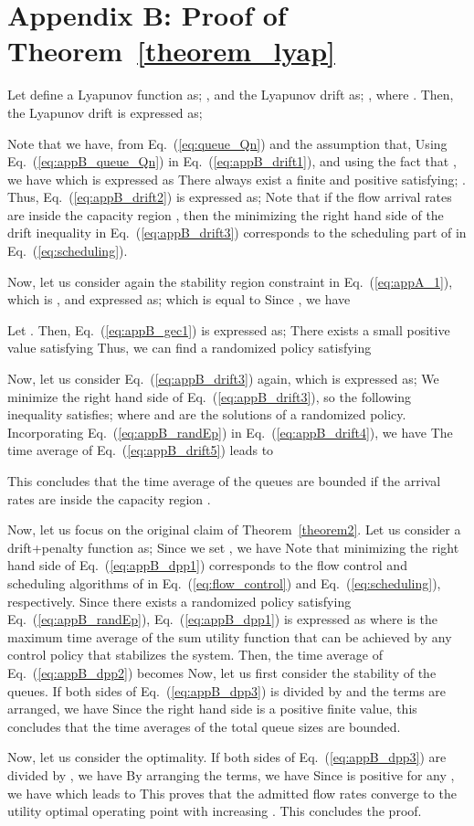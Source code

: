 \documentclass[conference]{IEEEtran}
\begin{document}
\section*{Appendix B: Proof of Theorem~\ref{theorem_lyap}}
Let define a Lyapunov function as; , and the Lyapunov drift as; , where . Then, the Lyapunov drift is expressed as; 
  

Note that we have, from Eq.~(\ref{eq:queue_Qn}) and the assumption  that,
 Using Eq.~(\ref{eq:appB_queue_Qn}) in Eq.~(\ref{eq:appB_drift1}), and using the fact that , we have 
 which is expressed as
 There always exist a finite and positive  satisfying; . Thus, Eq.~(\ref{eq:appB_drift2}) is expressed as; 
 Note that if the flow arrival rates  are inside the capacity region , then the minimizing the right hand side of the drift inequality in Eq.~(\ref{eq:appB_drift3}) corresponds to the scheduling part of  in Eq.~(\ref{eq:scheduling}). 

Now, let us consider again the stability region constraint in Eq.~(\ref{eq:appA_1}), which is   , and expressed as; 
 which is equal to
 Since , we have


  Let . Then, Eq.~(\ref{eq:appB_gec1}) is expressed as; 
  There exists a small positive value  satisfying
  Thus, we can find a randomized policy satisfying 


Now, let us consider Eq.~(\ref{eq:appB_drift3}) again, which is expressed as; 
 We minimize the right hand side of Eq.~(\ref{eq:appB_drift3}), so the following inequality satisfies; 
 where  and  are the solutions of a randomized policy. Incorporating Eq.~(\ref{eq:appB_randEp}) in Eq.~(\ref{eq:appB_drift4}), we have
 The time average of Eq.~(\ref{eq:appB_drift5}) leads to
 
 This concludes that the time average of the queues are bounded if the arrival rates are inside the capacity region . 

Now, let us focus on the original claim of Theorem~\ref{theorem2}. Let us consider a drift+penalty function as; 
 Since we set , we have
 Note that minimizing the right hand side of Eq.~(\ref{eq:appB_dpp1}) corresponds to the flow control and scheduling algorithms of  in Eq.~(\ref{eq:flow_control}) and Eq.~(\ref{eq:scheduling}), respectively. Since there exists a randomized policy satisfying Eq.~(\ref{eq:appB_randEp}), Eq.~(\ref{eq:appB_dpp1}) is expressed as
 where  is the maximum time average of the sum utility function that can be achieved by any control policy that stabilizes the system. Then, the time average of Eq.~(\ref{eq:appB_dpp2}) becomes 
 Now, let us first consider the stability of the queues. If both sides of Eq.~(\ref{eq:appB_dpp3}) is divided by  and the terms are arranged, we have
 Since the right hand side is a positive finite value, this concludes that the time averages of the total queue sizes are bounded. 

Now, let us consider the optimality. If both sides of Eq.~(\ref{eq:appB_dpp3}) are divided by , we have
 By arranging the terms, we have 
 Since  is positive for any , we have
 which leads to
 This proves that the admitted flow rates converge to the utility optimal operating point with increasing . This concludes the proof. 
\end{document}
